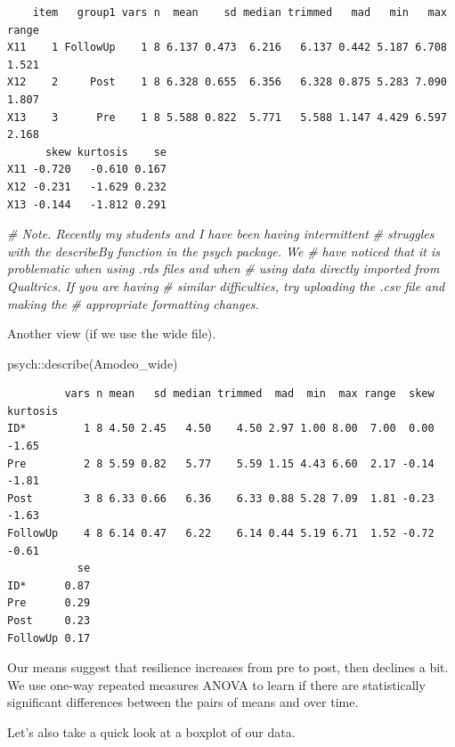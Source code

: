 \documentclass[
  11pt,
]{book}
\newenvironment{Shaded}{\begin{snugshade}}{\end{snugshade}}
\newcommand{\CommentTok}[1]{\textcolor[rgb]{0.56,0.35,0.01}{\textit{#1}}}
\newcommand{\FunctionTok}[1]{\textcolor[rgb]{0.00,0.00,0.00}{#1}}
\newcommand{\NormalTok}[1]{#1}
\newcommand{\SpecialCharTok}[1]{\textcolor[rgb]{0.00,0.00,0.00}{#1}}
\begin{document}
\begin{verbatim}
    item   group1 vars n  mean    sd median trimmed   mad   min   max range
X11    1 FollowUp    1 8 6.137 0.473  6.216   6.137 0.442 5.187 6.708 1.521
X12    2     Post    1 8 6.328 0.655  6.356   6.328 0.875 5.283 7.090 1.807
X13    3      Pre    1 8 5.588 0.822  5.771   5.588 1.147 4.429 6.597 2.168
      skew kurtosis    se
X11 -0.720   -0.610 0.167
X12 -0.231   -1.629 0.232
X13 -0.144   -1.812 0.291
\end{verbatim}

\begin{Shaded}
\begin{Highlighting}[]
\CommentTok{\# Note. Recently my students and I have been having intermittent}
\CommentTok{\# struggles with the describeBy function in the psych package. We}
\CommentTok{\# have noticed that it is problematic when using .rds files and when}
\CommentTok{\# using data directly imported from Qualtrics. If you are having}
\CommentTok{\# similar difficulties, try uploading the .csv file and making the}
\CommentTok{\# appropriate formatting changes.}
\end{Highlighting}
\end{Shaded}

Another view (if we use the wide file).

\begin{Shaded}
\begin{Highlighting}[]
\NormalTok{psych}\SpecialCharTok{::}\FunctionTok{describe}\NormalTok{(Amodeo\_wide)}
\end{Highlighting}
\end{Shaded}

\begin{verbatim}
         vars n mean   sd median trimmed  mad  min  max range  skew kurtosis
ID*         1 8 4.50 2.45   4.50    4.50 2.97 1.00 8.00  7.00  0.00    -1.65
Pre         2 8 5.59 0.82   5.77    5.59 1.15 4.43 6.60  2.17 -0.14    -1.81
Post        3 8 6.33 0.66   6.36    6.33 0.88 5.28 7.09  1.81 -0.23    -1.63
FollowUp    4 8 6.14 0.47   6.22    6.14 0.44 5.19 6.71  1.52 -0.72    -0.61
           se
ID*      0.87
Pre      0.29
Post     0.23
FollowUp 0.17
\end{verbatim}

Our means suggest that resilience increases from pre to post, then declines a bit. We use one-way repeated measures ANOVA to learn if there are statistically significant differences between the pairs of means and over time.

Let's also take a quick look at a boxplot of our data.
\end{document}
